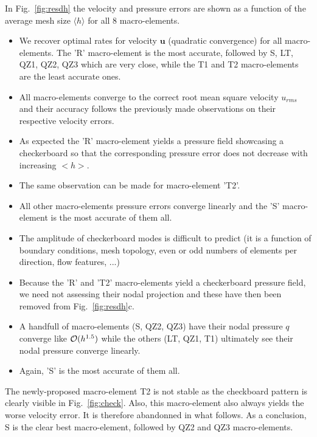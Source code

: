 \documentclass[a4paper]{article}
\begin{document}
In Fig.~\ref{fig:resdh} the velocity and pressure errors are shown as a function of the 
average mesh size $\langle h \rangle$ for all 8 macro-elements.

\begin{itemize}

\item We recover optimal rates for velocity ${\bm u}$ (quadratic convergence) for all macro-elements.
The 'R' macro-element is the most accurate, followed by S, LT, QZ1, QZ2, QZ3 which are very close, 
while the T1 and T2 macro-elements are the least accurate ones. 
\item All macro-elements converge to the correct root mean square velocity $u_{rms}$ and 
their accuracy follows the previously made observations on their respective velocity errors.

\item As expected the 'R' macro-element yields a pressure field showcasing a checkerboard so that 
the corresponding pressure error does not decrease with increasing $<h>$. 
\item The same observation can be made for macro-element 'T2'. 
\item All other macro-elements pressure errors converge linearly and the 'S' macro-element is
the most accurate of them all.
\item The amplitude of checkerboard modes is difficult to predict (it is a function 
of boundary conditions, mesh topology, even or odd numbers of elements per direction, flow features, ...) \cite{XXX} 

\item Because the 'R' and 'T2' macro-elements yield a checkerboard pressure field, we need not
assessing their nodal projection and these have then been removed from Fig.~\ref{fig:resdh}c.
\item A handfull of macro-elements (S, QZ2, QZ3) have their nodal pressure $q$ converge like ${\cal O}(h^{1.5})$
while the others (LT, QZ1, T1) ultimately see their nodal pressure converge linearly.
\item Again, 'S' is the most accurate of them all.

\end{itemize}


The newly-proposed macro-element T2 is not stable as the checkboard pattern is clearly visible in Fig.~\ref{fig:check}. 
Also, this macro-element also always yields the worse velocity error. It is therefore abandonned in what follows. 
As a conclusion, S is the clear best macro-element, followed by QZ2 and QZ3 macro-elements.
\end{document}
